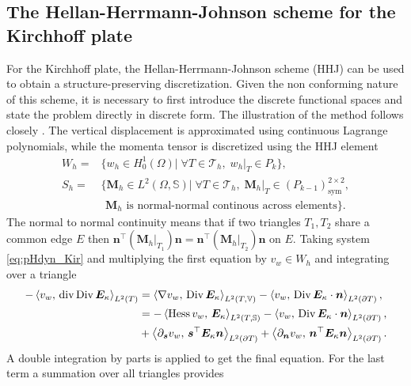 \subsection{The  Hellan-Herrmann-Johnson scheme for the Kirchhoff plate}\label{sec:HHJ}
For the Kirchhoff plate, the Hellan-Herrmann-Johnson scheme \cite{hellan1967,herrmann1967finite,johnson1973convergence} (HHJ) can be used to obtain a structure-preserving discretization. Given the non conforming nature of this scheme, it is necessary to first introduce the discrete functional spaces and state the problem directly in discrete form. The illustration of the method follows closely \cite{arnold2019hellan}. The vertical displacement is approximated using continuous Lagrange polynomials, while the momenta tensor is discretized using the HHJ element
\begin{equation}
\label{eq:HHJ}
\begin{aligned}
W_h = &\{w_h \in H^1_0(\Omega)| \; \forall T \in \mathcal{T}_h, \; w_h|_{T} \in P_{k} \}, \\
S_h = &\{\bm{M}_h \in L^2(\Omega, \mathbb{S})| \; \forall T \in \mathcal{T}_h, \; \bm{M}_h|_{T} \in (P_{k-1})^{2\times 2}_{\text{sym}} , \\ 
&\, \ \bm{M}_h \text{ is normal-normal continous across elements}\}.
\end{aligned}
\end{equation}
The normal to normal continuity means that if two triangles $T_1, T_2$ share a common edge $E$ then $\bm{n}^\top (\bm{M}_h|_{T_1}) \bm{n} = \bm{n}^\top (\bm{M}_h|_{T_2}) \bm{n}$ on $E$. Taking system \eqref{eq:pHdyn_Kir} and multiplying the first equation by $v_w \in W_h$ and integrating over a triangle
\begin{equation*}
\begin{aligned}
- \inner[L^2(T)]{v_w}{\div\Div \bm{E}_\kappa} &= \inner[L^2(T, \mathbb{V})]{\nabla v_w}{\Div \bm{E}_\kappa} - \inner[L^2(\partial T)]{v_w}{\Div \bm{E}_\kappa \cdot \bm{n}}, \\
&=-\inner[L^2(T, \mathbb{S})]{\Hess v_w}{\bm{E}_\kappa} - \inner[L^2(\partial T)]{v_w}{\Div \bm{E}_\kappa \cdot \bm{n}}, \\
&+\inner[L^2(\partial T)]{\partial_{\bm{s}} v_w}{\bm{s}^\top\bm{E}_\kappa \bm{n}} + \inner[L^2(\partial T)]{\partial_{\bm{n}} v_w}{\bm{n}^\top\bm{E}_\kappa \bm{n}}. \\
\end{aligned}
\end{equation*}
A double integration by parts is applied to get the final equation. For the last term a summation over all triangles provides
